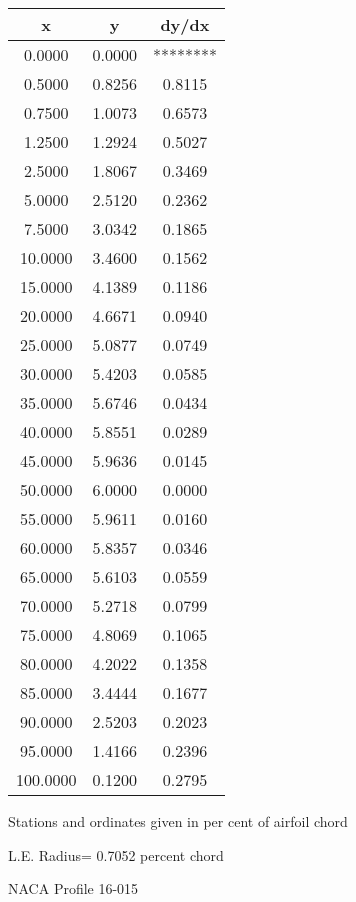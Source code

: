 \documentclass[11pt]{book}
\begin{document}
 \vspace{8mm}
 \begin{tabular}{|c|c|c|} \hline 
  x  &  y  &  dy/dx \\
 \hline
0.0000 & 0.0000 & ******** \\
0.5000 & 0.8256 & 0.8115 \\
0.7500 & 1.0073 & 0.6573 \\
1.2500 & 1.2924 & 0.5027 \\
2.5000 & 1.8067 & 0.3469 \\
5.0000 & 2.5120 & 0.2362 \\
7.5000 & 3.0342 & 0.1865 \\
10.0000 & 3.4600 & 0.1562 \\
15.0000 & 4.1389 & 0.1186 \\
20.0000 & 4.6671 & 0.0940 \\
25.0000 & 5.0877 & 0.0749 \\
30.0000 & 5.4203 & 0.0585 \\
35.0000 & 5.6746 & 0.0434 \\
40.0000 & 5.8551 & 0.0289 \\
45.0000 & 5.9636 & 0.0145 \\
50.0000 & 6.0000 & 0.0000 \\
55.0000 & 5.9611 & 0.0160 \\
60.0000 & 5.8357 & 0.0346 \\
65.0000 & 5.6103 & 0.0559 \\
70.0000 & 5.2718 & 0.0799 \\
75.0000 & 4.8069 & 0.1065 \\
80.0000 & 4.2022 & 0.1358 \\
85.0000 & 3.4444 & 0.1677 \\
90.0000 & 2.5203 & 0.2023 \\
95.0000 & 1.4166 & 0.2396 \\
100.0000 & 0.1200 & 0.2795 \\
 \hline
 \end{tabular}
 \vspace{8mm}


Stations and ordinates given in per cent of airfoil chord 


L.E. Radius=  0.7052 percent chord
 \newpage
  \label{p16-015}
 \begin{Large}
 NACA Profile 16-015
 \end{Large}
  
\end{document}
